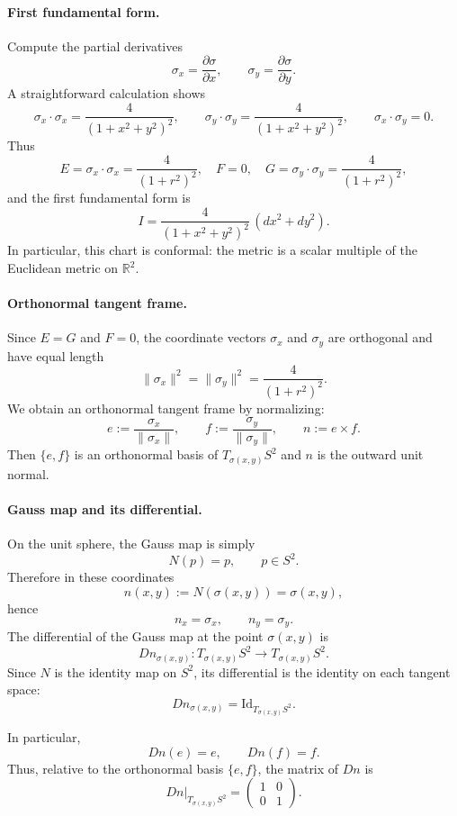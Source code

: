 \documentclass[12pt,a4paper]{article}
\theoremstyle{plain}
\theoremstyle{definition}      %
\begin{document}
\paragraph{First fundamental form.}
Compute the partial derivatives
\[
\sigma_x = \frac{\partial \sigma}{\partial x},\qquad
\sigma_y = \frac{\partial \sigma}{\partial y}.
\]
A straightforward calculation shows
\[
\sigma_x \cdot \sigma_x
= \frac{4}{(1 + x^2 + y^2)^2},\qquad
\sigma_y \cdot \sigma_y
= \frac{4}{(1 + x^2 + y^2)^2},\qquad
\sigma_x \cdot \sigma_y = 0.
\]
Thus
\[
E = \sigma_x\cdot\sigma_x
= \frac{4}{(1 + r^2)^2},\quad
F = 0,\quad
G = \sigma_y\cdot\sigma_y
= \frac{4}{(1 + r^2)^2},
\]
and the first fundamental form is
\[
I
= \frac{4}{(1 + x^2 + y^2)^2}\,(dx^2 + dy^2).
\]
In particular, this chart is conformal: the metric is a scalar multiple
of the Euclidean metric on $\mathbb{R}^2$.

\paragraph{Orthonormal tangent frame.}
Since $E = G$ and $F = 0$, the coordinate vectors $\sigma_x$ and $\sigma_y$
are orthogonal and have equal length
\[
\|\sigma_x\|^2 = \|\sigma_y\|^2
= \frac{4}{(1 + r^2)^2}.
\]
We obtain an orthonormal tangent frame by normalizing:
\[
e := \frac{\sigma_x}{\|\sigma_x\|},\qquad
f := \frac{\sigma_y}{\|\sigma_y\|},\qquad
n := e\times f.
\]
Then $\{e,f\}$ is an orthonormal basis of $T_{\sigma(x,y)}S^2$ and $n$ is
the outward unit normal.

\paragraph{Gauss map and its differential.}
On the unit sphere, the Gauss map is simply
\[
N(p) = p,\qquad p\in S^2.
\]
Therefore in these coordinates
\[
n(x,y) := N(\sigma(x,y)) = \sigma(x,y),
\]
hence
\[
n_x = \sigma_x,\qquad n_y = \sigma_y.
\]
The differential of the Gauss map at the point $\sigma(x,y)$ is
\[
Dn_{\sigma(x,y)} : T_{\sigma(x,y)}S^2 \longrightarrow T_{\sigma(x,y)}S^2.
\]
Since $N$ is the identity map on $S^2$, its differential is the identity on
each tangent space:
\[
Dn_{\sigma(x,y)} = \mathrm{Id}_{T_{\sigma(x,y)}S^2}.
\]

In particular,
\[
Dn(e) = e,\qquad Dn(f) = f.
\]
Thus, relative to the orthonormal basis $\{e,f\}$, the matrix of $Dn$ is
\[
Dn|_{T_{\sigma(x,y)}S^2}
=
\begin{pmatrix}
	1 & 0\\
	0 & 1
\end{pmatrix}.
\]
\end{document}
